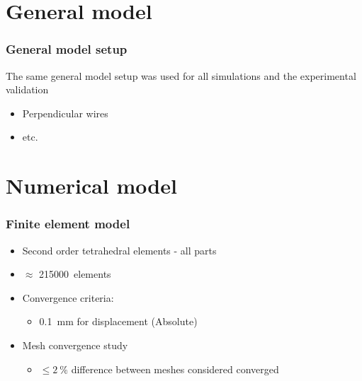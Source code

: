 \documentclass[aspectratio=169,xcolor={svgnames,table},10pt,fleqn]{beamer}
\begin{document}
\section{General model}

  \begin{frame}
    \frametitle{General model setup}
    The same general model setup was used for all simulations and the experimental validation
    \begin{itemize}
      \item Perpendicular wires
      \item etc.
    \end{itemize}
  \end{frame}

\section{Numerical model}

  \begin{frame}
    \frametitle{Finite element model}
    \begin{itemize}
      \item Second order tetrahedral elements - all parts
      \item $\approx$ \qty{215000}{elements}
      \item Convergence criteria:
        \begin{itemize}
          \item \qty{0.1}{\milli\meter} for displacement (Absolute)
        \end{itemize}
      \item Mesh convergence study
        \begin{itemize}
          \item $\le\qty{2}{\percent}$ difference between meshes considered converged 
        \end{itemize}
    \end{itemize}

  \end{frame}
\end{document}
